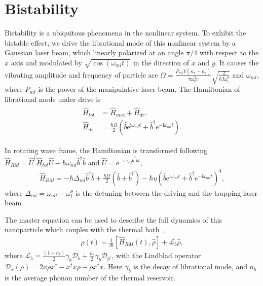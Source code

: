 \documentclass[pra,aps,superscriptaddress,showpacs,preprint]{revtex4}%
\begin{document}
\section{Bistability}
\label{SectIII}

Bistability is a ubiquitous phenomena in the nonlinear system. To exhibit the bistable effect, we drive the librational mode of this nonlinear system by a Gaussian laser beam, which linearly polarized at an angle $\pi/4$ with respect to the $x$ axis and modulated by $\sqrt{\cos(\omega_{ml}t)}$ in the direction of $x$ and $y$. It causes the vibrating amplitude and frequency of particle are $\Omega=\frac{P_{ml}V(\kappa_{x}-\kappa_{y})}{\pi\omega_{0}^{2}c}\sqrt{\frac{2}{\hbar I\omega_{t}^{\theta}}}$ and $\omega_{ml}$, where $P_{ml}$ is the power of the manipulative laser beam.  The Hamiltonian of librational mode under drive is
\begin{eqnarray}
 \begin{aligned}
 \hat{H}_{tot}&=\hat{H}_{mec}+\hat{H}_{dr},\\
 \hat{H}_{dr}&=\frac{\hbar\Omega}{2}(\hat{b}\mathrm{e}^{\mathrm{i}\omega_{ml}t}+\hat{b}^{\dag}\mathrm{e}^{-\mathrm{i}\omega_{ml}t}).
 \label{Eq:driving librational mode}
 \end{aligned}
\end{eqnarray}


In rotating wave frame, the Hamiltonian is transformed following $\hat{H}_{RM}=\hat{U}^{\dag}\hat{H}_{tot}\hat{U}-\hbar\omega_{ml}\hat{b}^{\dag}\hat{b}$ and $\hat{U}=\mathrm{e}^{-\mathrm{i}\omega_{ml}\hat{b}^{\dag}\hat{b}t}$,
\begin{eqnarray}
\hat{H}_{RM}=-\hbar\Delta_{ml}\hat{b}^{\dag}\hat{b}+\frac{\hbar\Omega}{2}(\hat{b}+\hat{b}^{\dag})-\hbar\eta(\hat{b}\mathrm{e}^{\mathrm{i}\omega_{ml}t}+\hat{b}^{\dag}\mathrm{e}^{-\mathrm{i}\omega_{ml}t})^{4}
\label{Eq:Hamiltonian in RWF},
\end{eqnarray}
where $\Delta_{ml}=\omega_{ml}-\omega_{t}^{\theta}$ is the detuning between the driving and the trapping laser beam.


The master equation can be used to describe the full dynamics of this nanoparticle which couples with the thermal bath~\cite{Louisell1973quantum},
\begin{eqnarray}
\dot{\hat{\rho}}(t)=\frac{1}{\mathrm{i}\hbar}[\hat{H}_{RM}(t),\hat{\rho}]+\mathscr{L}_{b}\hat{\rho}
\label{Eq:master equation},
\end{eqnarray}
where $\mathscr{L}_{b}=\frac{(1+\overline{n}_{b})}{2}\gamma_{b}\mathscr{D}_{b}+\frac{\overline{n}_{b}}{2}\gamma_{b}\mathscr{D}_{b^{\dag}}$, with the Lindblad operator $\mathscr{D}_{x}(\rho)=2x\rho x^{\dag}-x^{\dag}x\rho-\rho x^{\dag}x$. Here $\gamma_{b}$ is the decay of librational mode,  and $\overline{n}_{b}$ is the average phonon number of the thermal reservoir.
\end{document}
